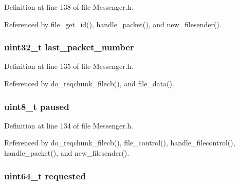Definition at line 138 of file Messenger.\+h.



Referenced by file\+\_\+get\+\_\+id(), handle\+\_\+packet(), and new\+\_\+filesender().

\hypertarget{struct_file___transfers_a14f807289cc5523a0081c7f87aed647e}{
\subsubsection[{last\+\_\+packet\+\_\+number}]{\setlength{\rightskip}{0pt plus 5cm}uint32\+\_\+t last\+\_\+packet\+\_\+number}}\label{struct_file___transfers_a14f807289cc5523a0081c7f87aed647e}


Definition at line 135 of file Messenger.\+h.



Referenced by do\+\_\+reqchunk\+\_\+filecb(), and file\+\_\+data().

\hypertarget{struct_file___transfers_a84bd3ab7c2cbad7fb0b6233504515973}{
\subsubsection[{paused}]{\setlength{\rightskip}{0pt plus 5cm}uint8\+\_\+t paused}}\label{struct_file___transfers_a84bd3ab7c2cbad7fb0b6233504515973}


Definition at line 134 of file Messenger.\+h.



Referenced by do\+\_\+reqchunk\+\_\+filecb(), file\+\_\+control(), handle\+\_\+filecontrol(), handle\+\_\+packet(), and new\+\_\+filesender().

\hypertarget{struct_file___transfers_a23cc26eca74ddec84f975c0be5496457}{
\subsubsection[{requested}]{\setlength{\rightskip}{0pt plus 5cm}uint64\+\_\+t requested}}\label{struct_file___transfers_a23cc26eca74ddec84f975c0be5496457}


